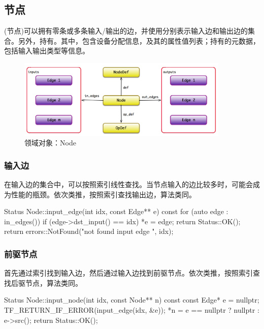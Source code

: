 \begin{content}
\subsection{节点}

(节点)可以拥有零条或多条输入/输出的边，并使用分别表示输入边和输出边的集合。另外，持有。其中，包含设备分配信息，及其的属性值列表；持有的元数据，包括输入输出类型等信息。

\begin{figure}[!htbp]
\centering
\includegraphics[width=0.9\textwidth]{figures/cc-node-model.png}
\caption{领域对象：Node}
 \label{fig:cc-node-model}
\end{figure}

\subsubsection{输入边}

在输入边的集合中，可以按照索引线性查找。当节点输入的边比较多时，可能会成为性能的瓶颈。依次类推，按照索引查找输出边，算法类同。

\begin{leftbar}
\begin{c++}
Status Node::input_edge(int idx, const Edge** e) const {
  for (auto edge : in_edges()) {
    if (edge->dst_input() == idx) {
      *e = edge;
      return Status::OK();
    }
  }
  return errors::NotFound("not found input edge ", idx);
}
\end{c++}
\end{leftbar}

\subsubsection{前驱节点}

首先通过索引找到输入边，然后通过输入边找到前驱节点。依次类推，按照索引查找后驱节点，算法类同。

\begin{leftbar}
\begin{c++}
Status Node::input_node(int idx, const Node** n) const {
  const Edge* e = nullptr;
  TF_RETURN_IF_ERROR(input_edge(idx, &e));
  *n = e == nullptr ? nullptr : e->src();
  return Status::OK();
}
\end{c++}
\end{leftbar}


\end{content}
